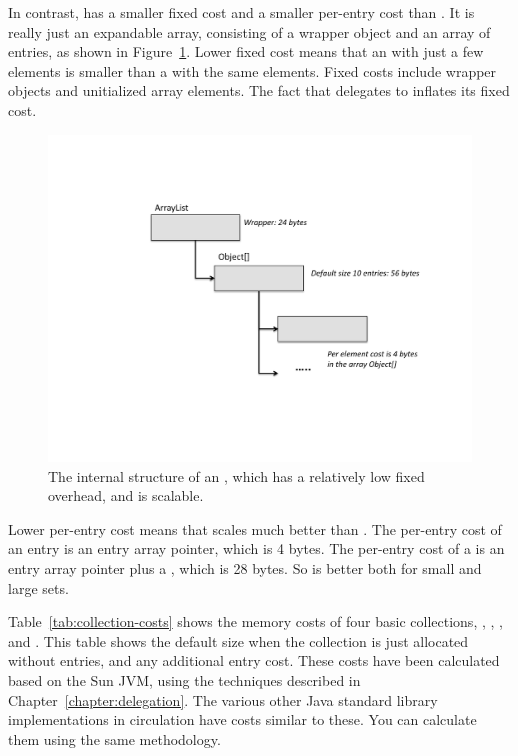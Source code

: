 In contrast,  has a smaller fixed cost and a smaller
per-entry cost than . It is really just an expandable array,
consisting of a wrapper object and an array of entries, as shown in Figure~\ref{fig:arraylist}. 
Lower fixed cost means that an  with just a few
 elements is smaller than a  with the same elements. Fixed costs
 include wrapper objects and unitialized array elements. The fact that 
 delegates to  inflates its fixed cost. 
 \begin{figure}
  \centering
 \includegraphics[width=.80\textwidth]{part1/Figures/collections/arraylist.pdf}
  \caption{The internal structure of an , which has a
  relatively low fixed overhead, and is scalable.}
  \label{fig:arraylist}
\end{figure}
 Lower per-entry cost means that
  scales much better than . The per-entry cost
 of an  entry is an entry array pointer, which is 4 bytes.
 The per-entry cost of a  is an entry array pointer plus a
 , which is 28 bytes. So   is better
 both for small and large sets.

Table~\ref{tab:collection-costs} shows the memory costs of four basic
collections, , , , and .
This table shows the default size when the collection is just allocated without
entries, and any additional entry cost. These costs have
been calculated based on the Sun JVM, using the techniques described in Chapter~\ref{chapter:delegation}. 
The various other Java standard
library implementations in circulation have costs
similar to these. You can calculate them using the same methodology.



